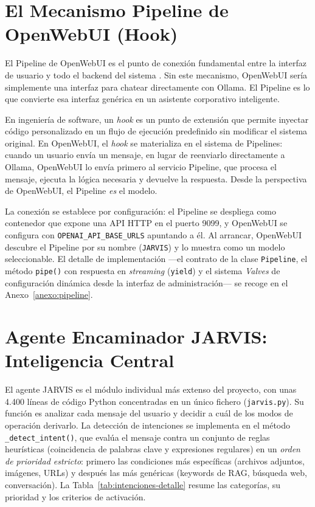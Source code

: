 \section[Pipeline de OpenWebUI]{El Mecanismo Pipeline de OpenWebUI (Hook)}
\label{sec:hook-pipeline}

El Pipeline de OpenWebUI es el punto de conexión fundamental entre la interfaz de usuario y todo el backend del sistema \cite{openwebui2024docs}. Sin este mecanismo, OpenWebUI sería simplemente una interfaz para chatear directamente con Ollama. El Pipeline es lo que convierte esa interfaz genérica en un asistente corporativo inteligente.

En ingeniería de software, un \textit{hook} es un punto de extensión que permite inyectar código personalizado en un flujo de ejecución predefinido sin modificar el sistema original. En OpenWebUI, el \textit{hook} se materializa en el sistema de Pipelines: cuando un usuario envía un mensaje, en lugar de reenviarlo directamente a Ollama, OpenWebUI lo envía primero al servicio Pipeline, que procesa el mensaje, ejecuta la lógica necesaria y devuelve la respuesta. Desde la perspectiva de OpenWebUI, el Pipeline \textit{es} el modelo.

La conexión se establece por configuración: el Pipeline se despliega como contenedor que expone una API HTTP en el puerto 9099, y OpenWebUI se configura con \texttt{OPENAI\_API\_BASE\_URLS} apuntando a él. Al arrancar, OpenWebUI descubre el Pipeline por su nombre (\texttt{JARVIS}) y lo muestra como un modelo seleccionable. El detalle de implementación ---el contrato de la clase \texttt{Pipeline}, el método \texttt{pipe()} con respuesta en \textit{streaming} (\texttt{yield}) y el sistema \textit{Valves} de configuración dinámica desde la interfaz de administración--- se recoge en el Anexo~\ref{anexo:pipeline}.

\section{Agente Encaminador JARVIS: Inteligencia Central}
\label{sec:jarvis-detalle}

El agente JARVIS es el módulo individual más extenso del proyecto, con unas 4.400 líneas de código Python concentradas en un único fichero (\texttt{jarvis.py}). Su función es analizar cada mensaje del usuario y decidir a cuál de los modos de operación derivarlo. La detección de intenciones se implementa en el método \texttt{\_detect\_intent()}, que evalúa el mensaje contra un conjunto de reglas heurísticas (coincidencia de palabras clave y expresiones regulares) en un \textit{orden de prioridad estricto}: primero las condiciones más específicas (archivos adjuntos, imágenes, URLs) y después las más genéricas (keywords de RAG, búsqueda web, conversación). La Tabla~\ref{tab:intenciones-detalle} resume las categorías, su prioridad y los criterios de activación.

